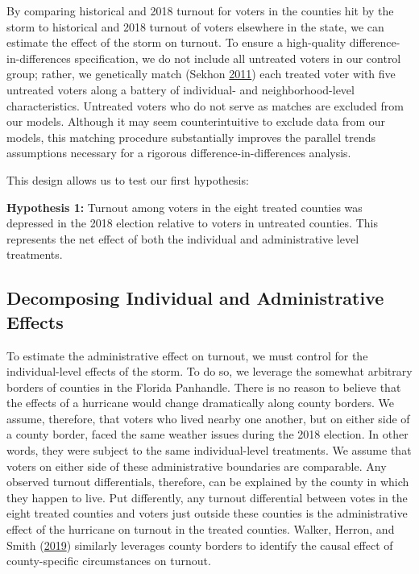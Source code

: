 \documentclass[
  12pt,
]{article}
\begin{document}
By comparing historical and 2018 turnout for voters in the counties hit by the storm to historical and 2018 turnout of voters elsewhere in the state, we can estimate the effect of the storm on turnout. To ensure a high-quality difference-in-differences specification, we do not include all untreated voters in our control group; rather, we genetically match (Sekhon \protect\hyperlink{ref-Sekhon2011}{2011}) each treated voter with five untreated voters along a battery of individual- and neighborhood-level characteristics. Untreated voters who do not serve as matches are excluded from our models. Although it may seem counterintuitive to exclude data from our models, this matching procedure substantially improves the parallel trends assumptions necessary for a rigorous difference-in-differences analysis.

This design allows us to test our first hypothesis:

\textbf{Hypothesis 1:} Turnout among voters in the eight treated counties was depressed in the 2018 election relative to voters in untreated counties. This represents the net effect of both the individual and administrative level treatments.

\hypertarget{decomposing-individual-and-administrative-effects}{%
\subsection*{Decomposing Individual and Administrative Effects}\label{decomposing-individual-and-administrative-effects}}

To estimate the administrative effect on turnout, we must control for the individual-level effects of the storm. To do so, we leverage the somewhat arbitrary borders of counties in the Florida Panhandle. There is no reason to believe that the effects of a hurricane would change dramatically along county borders. We assume, therefore, that voters who lived nearby one another, but on either side of a county border, faced the same weather issues during the 2018 election. In other words, they were subject to the same individual-level treatments. We assume that voters on either side of these administrative boundaries are comparable. Any observed turnout differentials, therefore, can be explained by the county in which they happen to live. Put differently, any turnout differential between votes in the eight treated counties and voters just outside these counties is the administrative effect of the hurricane on turnout in the treated counties. Walker, Herron, and Smith (\protect\hyperlink{ref-Walker2019}{2019}) similarly leverages county borders to identify the causal effect of county-specific circumstances on turnout.
\end{document}
